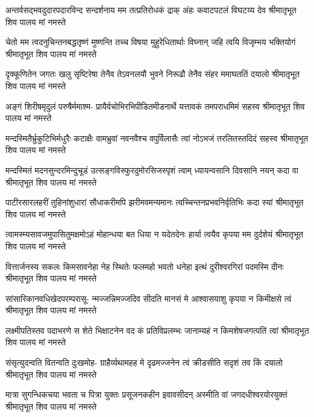 \fourlineindentedshloka
{अन्तर्वसद्भवदुदारपदारविन्द}
{सन्दर्शनाय मम तत्प्रतिरोधकं द्राक्}
{अंहः कवाटपटलं विघटय्य देव}
{श्रीमातृभूत शिव पालय मां नमस्ते} %

\fourlineindentedshloka
{चेतो मम त्वदनुचिन्तनबद्धतृष्णं}
{मुष्णन्ति तच्च विषया मुहुरेधितार्थाः}
{विघ्नान् जहि त्वयि विजृम्भय भक्तियोगं}
{श्रीमातृभूत शिव पालय मां नमस्ते} %

\fourlineindentedshloka
{दृक्कूणितेन जगतः खलु सृष्टिरेषा}
{तेनैव तेऽवनलयौ भुवने निरूढौ}
{तेनैव संहर ममाघततिं दयालो}
{श्रीमातृभूत शिव पालय मां नमस्ते} %

\fourlineindentedshloka
{अङ्गं शिरीषमृदुलं परुषैर्ममाश्म-}
{प्रायैर्वचोभिरभिपीडितमीडनार्थे}
{यत्तावकं तमपराधमिमं सहस्व}
{श्रीमातृभूत शिव पालय मां नमस्ते} %

\fourlineindentedshloka
{मन्दस्मितैर्भ्रुकुटिभिर्मधुरैः कटाक्षैः}
{वामभ्रुवां नवनवैश्च वपुर्विलासैः}
{त्वां नोऽभजं तरलितस्तदिदं सहस्व}
{श्रीमातृभूत शिव पालय मां नमस्ते} %

\fourlineindentedshloka
{मन्दस्मितं मदनसुन्दरमिन्दुचूडं}
{उत्सङ्गविस्फुरदुमोरसिजस्पृशं त्वाम्}
{ध्यायन्वसानि दिवसानि नयन् कदा वा}
{श्रीमातृभूत शिव पालय मां नमस्ते} %

\fourlineindentedshloka
{पाटीरसारलहरीं तुहिनांशुधारां}
{सौधाकरीमपि झरीमवमन्यमानः}
{त्वच्चिन्तनप्रभवनिर्वृतिभिः कदा स्यां}
{श्रीमातृभूत शिव पालय मां नमस्ते} %

\fourlineindentedshloka
{त्वामस्म्यसावजमुपासितुमक्षमोऽहं}
{मोहान्धया बत धिया न यदेतदेनः}
{हार्या त्वयैव कृपया मम दुर्दशेयं}
{श्रीमातृभूत शिव पालय मां नमस्ते} %

\fourlineindentedshloka
{वित्तार्जनस्य सकलः किमसावनेहा}
{नेह स्थितेः फलमहो भवतो धनेहा}
{ इत्थं दुरीश्वरगिरां पदमस्मि दीनः}
{श्रीमातृभूत शिव पालय मां नमस्ते} %

\fourlineindentedshloka
{सांसारिकानवधिखेदपरम्परासू-}
{न्मज्जन्निमज्जदिव सीदति मानसं मे}
{आश्वासयाशु कृपया न किमीक्षसे त्वं}
{श्रीमातृभूत शिव पालय मां नमस्ते} %

\fourlineindentedshloka
{लक्ष्मीपतिस्तव पदाभरणे स शेते}
{भिक्षाटनेन वद कं प्रतिविप्रलम्भः}
{जानाम्यहं न किमशेषजगत्पतिं त्वां}
{श्रीमातृभूत शिव पालय मां नमस्ते} %

\fourlineindentedshloka
{संसृत्युदन्वति वितन्वति दुःखमोह-}
{ग्राहैर्व्यथामहह मे दृढमज्जनेन}
{त्वं क्रीडसीति सदृशं तव किं दयालो}
{श्रीमातृभूत शिव पालय मां नमस्ते} %

\fourlineindentedshloka
{मात्रा सुगन्धिकचया भवता च पित्रा}
{युक्तः प्रसूजनकहीन इवावसीदन्}
{अस्मीति वां जगदधीश्वरयोरयुक्तं}
{श्रीमातृभूत शिव पालय मां नमस्ते} %

